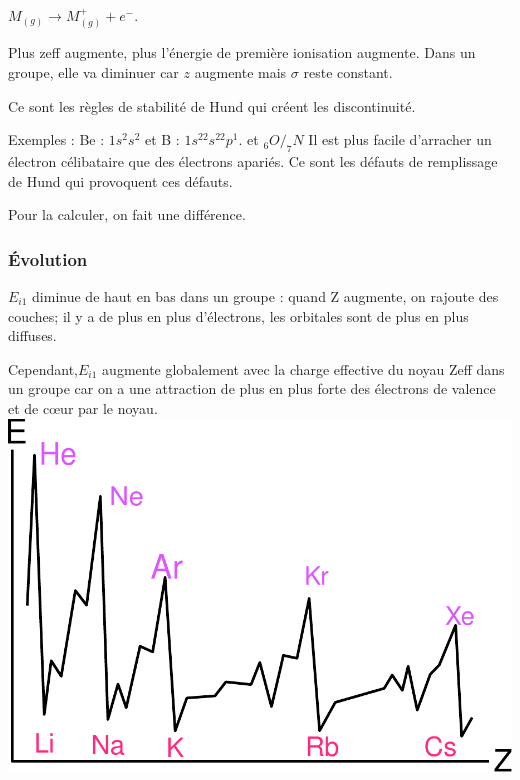 \documentclass[french]{yLectureNote}
\begin{document}
$M_{(g)} \to M^+_{(g)} + e^-$.

Plus zeff augmente, plus l'énergie de première ionisation augmente. Dans un groupe, elle va diminuer car $z$ augmente mais $\sigma$ reste constant.

Ce sont les règles de stabilité de Hund qui créent les discontinuité.

Exemples : Be : $1s^2s^2$ et B : $1s^22s^22p^1$. et $_6O/_7N$ Il est plus facile d'arracher un électron célibataire que des électrons apariés. Ce sont les défauts de remplissage de Hund qui provoquent ces défauts.

Pour la calculer, on fait une différence.
\subsubsection{Évolution}

\begin{multicols}{2}
$E_{i1}$ diminue de haut en bas dans un groupe : quand
Z augmente, on rajoute des couches; il y a de plus
en plus d’électrons, les orbitales sont de plus en
plus diffuses.

Cependant,$E_{i1}$ augmente globalement avec la charge
effective du noyau Zeff dans un groupe car on a une
attraction de plus en plus forte des électrons de
valence et de cœur par le noyau.
\columnbreak
\includegraphics[scale=0.3]{ionisation}
\end{multicols}
\end{document}
